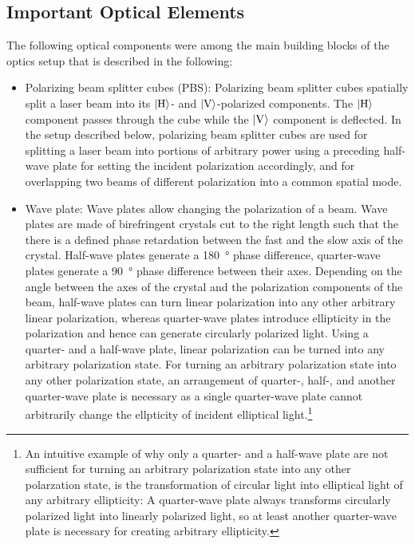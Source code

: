 \subsection*{Important Optical Elements}
The following optical components were among the main building blocks of the optics setup that is described in the following: 
\begin{itemize}
    \item Polarizing beam splitter cubes (PBS): Polarizing beam splitter cubes spatially split a laser beam into its $\Ket{\text{H}}$- and $\Ket{\text{V}}$-polarized components. The $\Ket{\text{H}}$ component passes through the cube while the $\Ket{\text{V}}$ component is deflected. In the setup described below, polarizing beam splitter cubes are used for splitting a laser beam into portions of arbitrary power using a preceding half-wave plate for setting the incident polarization accordingly, and for overlapping two beams of different polarization into a common spatial mode.
    \item Wave plate: Wave plates allow changing the polarization of a beam. Wave plates are made of birefringent crystals cut to the right length such that the there is a defined phase retardation between the fast and the slow axis of the crystal. Half-wave plates generate a \SI{180}{\degree} phase difference, quarter-wave plates generate a \SI{90}{\degree} phase difference between their axes. Depending on the angle between the axes of the crystal and the polarization components of the beam, half-wave plates can turn linear polarization into any other arbitrary linear polarization, whereas quarter-wave plates introduce ellipticity in the polarization and hence can generate circularly polarized light. Using a quarter- and a half-wave plate, linear polarization can be turned into any arbitrary polarization state. For turning an arbitrary polarization state into any other polarization state, an arrangement of quarter-, half-, and another quarter-wave plate is necessary as a single quarter-wave plate cannot arbitrarily change the ellpticity of incident elliptical light.\footnote{An intuitive example of why only a quarter- and a half-wave plate are not sufficient for turning an arbitrary polarization state into any other polarzation state, is the transformation of circular light into elliptical light of any arbitrary ellipticity: A quarter-wave plate always transforms circularly polarized light into linearly polarized light, so at least another quarter-wave plate is necessary for creating arbitrary ellipticity.}

\end{itemize}
